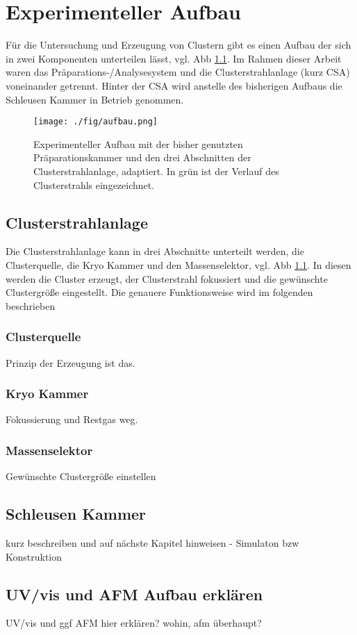 \chapter{Experimenteller Aufbau}
Für die Untersuchung und Erzeugung von Clustern gibt es einen Aufbau der sich in zwei Komponenten unterteilen lässt, vgl. Abb \ref{fig:aufbau}.
Im Rahmen dieser Arbeit waren das Präparations-/Analysesystem und die Clusterstrahlanlage (kurz CSA) voneinander getrennt.
Hinter der CSA wird anstelle des bisherigen Aufbaus die Schleusen Kammer in Betrieb genommen.
\begin{figure}
    \centering
    \texttt{[image: ./fig/aufbau.png]}
    \caption{Experimenteller Aufbau mit der bisher genutzten Präparationskammer und den drei Abschnitten der Clusterstrahlanlage, \cite{wolter} adaptiert. 
    In grün ist der Verlauf des Clusterstrahls eingezeichnet.}
    \label{fig:aufbau}
\end{figure}
\section{Clusterstrahlanlage}
Die Clusterstrahlanlage kann in drei Abschnitte unterteilt werden, die Clusterquelle, die Kryo Kammer und den Massenselektor, vgl. Abb \ref{fig:aufbau}.
In diesen werden die Cluster erzeugt, der Clusterstrahl fokussiert und die gewünschte Clustergröße eingestellt. Die genauere Funktionsweise wird im folgenden beschrieben
\subsection{Clusterquelle}
Prinzip der Erzeugung ist das.
\subsection{Kryo Kammer}
Fokussierung und Restgas weg.
\subsection{Massenselektor}
Gewünschte Clustergröße einstellen
\section{Schleusen Kammer}
kurz beschreiben und auf nächste Kapitel hinweisen - Simulaton bzw Konstruktion

\section{UV/vis und AFM Aufbau erklären}
UV/vis und ggf AFM hier erklären? wohin, afm überhaupt?
